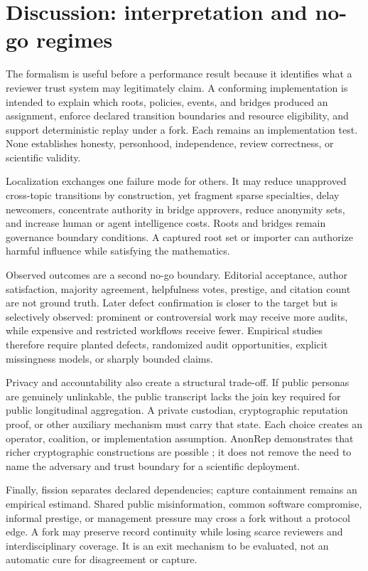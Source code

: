 \documentclass[11pt]{article}
\begin{document}
\section{Discussion: interpretation and no-go regimes}

The formalism is useful before a performance result because it identifies what a reviewer trust system may legitimately claim. A conforming implementation is intended to explain which roots, policies, events, and bridges produced an assignment, enforce declared transition boundaries and resource eligibility, and support deterministic replay under a fork. Each remains an implementation test. None establishes honesty, personhood, independence, review correctness, or scientific validity.

Localization exchanges one failure mode for others.  It may reduce unapproved cross-topic transitions by construction, yet fragment sparse specialties, delay newcomers, concentrate authority in bridge approvers, reduce anonymity sets, and increase human or agent intelligence costs.  Roots and bridges remain governance boundary conditions.  A captured root set or importer can authorize harmful influence while satisfying the mathematics.

Observed outcomes are a second no-go boundary.  Editorial acceptance, author satisfaction, majority agreement, helpfulness votes, prestige, and citation count are not ground truth.  Later defect confirmation is closer to the target but is selectively observed: prominent or controversial work may receive more audits, while expensive and restricted workflows receive fewer.  Empirical studies therefore require planted defects, randomized audit opportunities, explicit missingness models, or sharply bounded claims.

Privacy and accountability also create a structural trade-off.  If public personas are genuinely unlinkable, the public transcript lacks the join key required for public longitudinal aggregation.  A private custodian, cryptographic reputation proof, or other auxiliary mechanism must carry that state.  Each choice creates an operator, coalition, or implementation assumption.  AnonRep demonstrates that richer cryptographic constructions are possible \citep{zhai2016anonrep}; it does not remove the need to name the adversary and trust boundary for a scientific deployment.

Finally, fission separates declared dependencies; capture containment remains an empirical estimand. Shared public misinformation, common software compromise, informal prestige, or management pressure may cross a fork without a protocol edge. A fork may preserve record continuity while losing scarce reviewers and interdisciplinary coverage. It is an exit mechanism to be evaluated, not an automatic cure for disagreement or capture.
\end{document}
